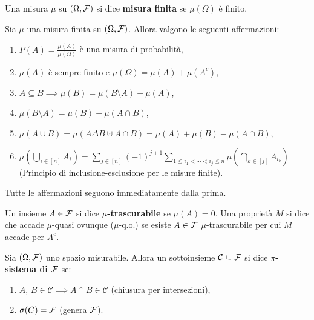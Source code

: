 \begin{multicols*}{2}
\begin{definition}
    Una misura $\mu$ su $(\Omega, \mathcal{F})$ si dice \textbf{misura finita} se $\mu(\Omega)$ è finito.
\end{definition}

\begin{proposition}
    Sia $\mu$ una misura finita su $(\Omega, \mathcal{F})$. Allora valgono le seguenti affermazioni:
    \begin{enumerate}[(i.)]
        \item $P(A) = \frac{\mu(A)}{\mu(\Omega)}$ è una misura di probabilità,
        \item $\mu(A)$ è sempre finito e $\mu(\Omega) = \mu(A) + \mu(A^c)$,
        \item $A \subseteq B \implies \mu(B) = \mu(B \setminus A) + \mu(A)$,
        \item $\mu(B \setminus A) = \mu(B) - \mu(A \cap B)$,
        \item $\mu(A \cup B) = \mu(A \Delta B \cupdot A \cap B) = \mu(A) + \mu(B) - \mu(A \cap B)$,
        \item $\mu\left(\bigcup_{i \in [n]} A_i\right) = \sum_{j \in [n]} (-1)^{j+1} \sum_{1 \leq i_1 < \cdots < i_j \leq n} \mu\left(\bigcap_{k \in [j]} A_{i_{k}}\right)$ (Principio di inclusione-esclusione per le misure finite).
    \end{enumerate}

    Tutte le affermazioni seguono immediatamente dalla prima.
\end{proposition}

\begin{definition}
    Un insieme $A \in \mathcal{F}$ si dice \textbf{$\mu$-trascurabile} se
    $\mu(A) = 0$. Una proprietà $M$ si dice che accade
    $\mu$-quasi ovunque ($\mu$-q.o.) se esiste $A \in \mathcal{F}$ $\mu$-trascurabile per cui
    $M$ accade per $A^c$.
\end{definition}

\begin{definition}
    Sia $(\Omega, \mathcal{F})$ uno spazio misurabile. Allora un sottoinsieme $\mathcal{C} \subseteq \mathcal{F}$
    si dice \textbf{$\pi$-sistema di $\mathcal{F}$} se:
    \begin{enumerate}[(i.)]
        \item $A$, $B \in \mathcal{C} \implies A \cap B \in \mathcal{C}$ (chiusura per intersezioni),
        \item $\sigma(C) = \mathcal{F}$ (genera $\mathcal{F}$).
    \end{enumerate}
\end{definition}


\end{multicols*}
